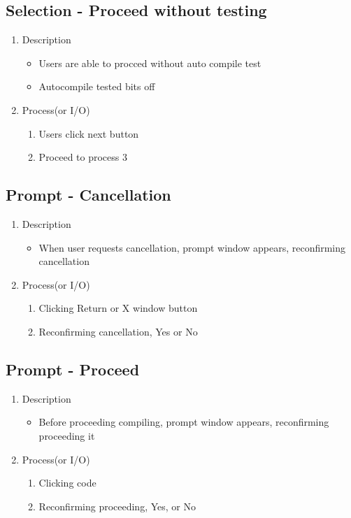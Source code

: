 \documentclass[conference]{IEEEtran}
\begin{document}
\subsection{Selection - Proceed without testing}
\begin{enumerate}
  \item Description
  \begin{itemize}
    \item Users are able to procced without auto compile test
    \item Autocompile tested bits off
  \end{itemize}
  \item Process(or I/O)
  \begin{enumerate}
    \item Users click next button
    \item Proceed to process 3
  \end{enumerate}
\end{enumerate}
\textit{}


\subsection{Prompt - Cancellation}
\begin{enumerate}
  \item Description
  \begin{itemize}
    \item When user requests cancellation, prompt window appears, reconfirming cancellation
  \end{itemize}
  \item Process(or I/O)
  \begin{enumerate}
    \item Clicking Return or X window button
    \item Reconfirming cancellation, Yes or No
  \end{enumerate}
\end{enumerate}
\textit{}



\subsection{Prompt - Proceed}
\begin{enumerate}
  \item Description
  \begin{itemize}
    \item Before proceeding compiling, prompt window appears, reconfirming proceeding it
  \end{itemize}
  \item Process(or I/O)
  \begin{enumerate}
    \item Clicking code
    \item Reconfirming proceeding, Yes, or No
  \end{enumerate}
\end{enumerate}
\textit{}
\end{document}
